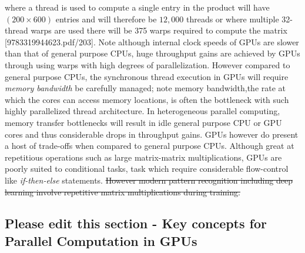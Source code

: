 \documentclass[10pt]{article}[draft]
\begin{document}
where a thread is used to compute a single entry in the product will have $(200 \times 600)$ entries and  will therefore be $12,000$ threads or where multiple 32-thread warps are used there will be 375 warps required to compute the matrix [9783319944623.pdf/203].  Note although internal clock speeds of GPUs are  slower than that of general purpose CPUs, huge throughput gains are achieved by GPUs through using warps with high degrees of parallelization. However compared to general purpose CPUs, the synchronous thread execution in GPUs will require \emph{memory bandwidth}  be carefully managed; note memory bandwidth,the rate at which the cores can access memory locations, is often the bottleneck with such highly parallelized thread architecture. In heterogeneous parallel computing, memory transfer bottlenecks will result in idle general purpose CPU or GPU cores and thus considerable drops in throughput gains. GPUs however do present a host of trade-offs when compared to general purpose CPUs. Although great at repetitious operations such as large matrix-matrix multiplications, GPUs are poorly suited to conditional tasks, task which require considerable flow-control like \emph{if-then-else} statements. \st{However modern pattern recognition including deep learning involve repetitive matrix multiplications during training.}

\subsection{Please edit this section - Key concepts for Parallel Computation in GPUs}
\end{document}
